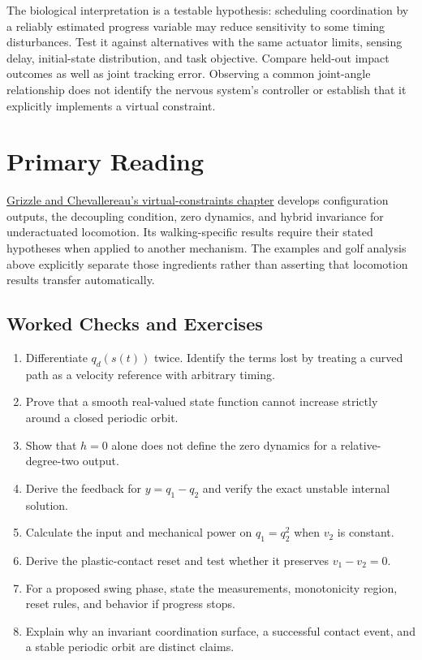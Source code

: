 The biological interpretation is a testable hypothesis: scheduling coordination by a reliably estimated progress variable may reduce sensitivity to some timing disturbances. Test it against alternatives with the same actuator limits, sensing delay, initial-state distribution, and task objective. Compare held-out impact outcomes as well as joint tracking error. Observing a common joint-angle relationship does not identify the nervous system's controller or establish that it explicitly implements a virtual constraint.

\section{Primary Reading}

\href{https://grizzle.robotics.umich.edu/files/HZD_HandbookApril2015.pdf}{Grizzle and Chevallereau's virtual-constraints chapter} develops configuration outputs, the decoupling condition, zero dynamics, and hybrid invariance for underactuated locomotion. Its walking-specific results require their stated hypotheses when applied to another mechanism. The examples and golf analysis above explicitly separate those ingredients rather than asserting that locomotion results transfer automatically.

\begin{samepage}
\section{Worked Checks and Exercises}

\begin{enumerate}[itemsep=0.25em,parsep=0pt]
\item Differentiate $q_d(s(t))$ twice. Identify the terms lost by treating a curved path as a velocity reference with arbitrary timing.
\item Prove that a smooth real-valued state function cannot increase strictly around a closed periodic orbit.
\item Show that $h=0$ alone does not define the zero dynamics for a relative-degree-two output.
\item Derive the feedback for $y=q_1-q_2$ and verify the exact unstable internal solution.
\item Calculate the input and mechanical power on $q_1=q_2^2$ when $v_2$ is constant.
\item Derive the plastic-contact reset and test whether it preserves $v_1-v_2=0$.
\item For a proposed swing phase, state the measurements, monotonicity region, reset rules, and behavior if progress stops.
\item Explain why an invariant coordination surface, a successful contact event, and a stable periodic orbit are distinct claims.
\end{enumerate}
\end{samepage}
